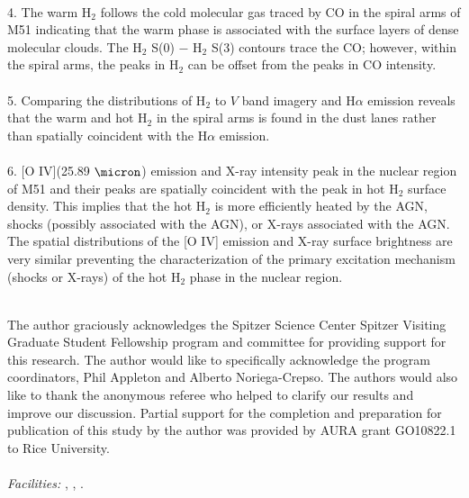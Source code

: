 \documentclass[12pt,preprint]{aastex}
\begin{document}
\\
4. The warm H$_2$ follows the cold molecular gas traced by CO 
in the spiral arms of M51 indicating that the warm phase is associated 
with the surface layers of dense molecular clouds.  The H$_2$ S(0) $-$
H$_2$ S(3) contours trace the CO; however, within the spiral
arms, the peaks in H$_2$ can be offset from the peaks in CO
intensity.\\
\\
5.  Comparing the distributions of H$_2$ to 
$V$ band imagery and H$\alpha$ emission reveals
that the warm and hot H$_2$ in the spiral arms is found in the dust lanes
rather than spatially coincident with the H$\alpha$ emission.\\
\\
6.  [O IV](25.89 $\micron$) emission and X-ray
intensity peak in the nuclear region of M51 and their 
peaks are spatially coincident with the peak in hot H$_2$ 
surface density.  This implies that the hot H$_2$ 
is more efficiently heated by the AGN, shocks (possibly associated
with the AGN), or X-rays associated with the AGN.  The spatial
distributions of the [O IV] emission and X-ray surface brightness are
very similar preventing the characterization of the primary excitation 
mechanism (shocks or X-rays) of the hot H$_2$ phase in the nuclear region.\\ 
\\

\acknowledgments

The author graciously acknowledges the Spitzer Science Center Spitzer
Visiting Graduate Student Fellowship program and committee for
providing support for this research.  The author would like to
specifically acknowledge the program coordinators, Phil Appleton and
Alberto Noriega-Crepso. The authors would also like to thank the 
anonymous referee who helped to clarify our results and improve our discussion.
Partial support for the completion and preparation for publication of this study by the
author was provided by AURA grant GO10822.1 to Rice
University.\\ 
\\
{\it Facilities:} , ,
.
\end{document}
